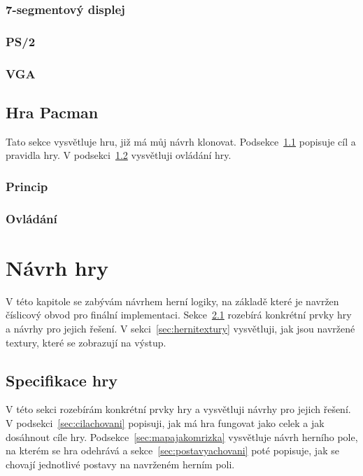 \documentclass{report}
\begin{document}
\subsection{7-segmentový displej}\label{sec:7segment}
\subsection{PS/2}\label{sec:ps2}
\subsection{VGA}\label{sec:vga}

\section{Hra Pacman}\label{sec:hrapacman}
Tato sekce vysvětluje hru, již má můj návrh klonovat. Podsekce~\ref{sec:principhry} popisuje cíl a pravidla hry. V podsekci~\ref{sec:ovladanihry} vysvětluji ovládání hry.
\subsection{Princip}\label{sec:principhry}
\subsection{Ovládání}\label{sec:ovladanihry}

\chapter{Návrh hry}
V této kapitole se zabývám návrhem herní logiky, na základě které je navržen číslicový obvod pro finální implementaci. Sekce~\ref{sec:specifikacehry} rozebírá konkrétní prvky hry a návrhy pro jejich řešení. V sekci~\ref{sec:hernitextury} vysvětluji, jak jsou navržené textury, které se zobrazují na výstup.

\section{Specifikace hry}\label{sec:specifikacehry}
V této sekci rozebírám konkrétní prvky hry a vysvětluji návrhy pro jejich řešení. V podsekci~\ref{sec:cilachovani} popisuji, jak má hra fungovat jako celek a jak dosáhnout cíle hry. Podsekce~\ref{sec:mapajakomrizka} vysvětluje návrh herního pole, na kterém se hra odehrává a sekce~\ref{sec:postavyachovani} poté popisuje, jak se chovají jednotlivé postavy na navrženém herním poli.
\end{document}
